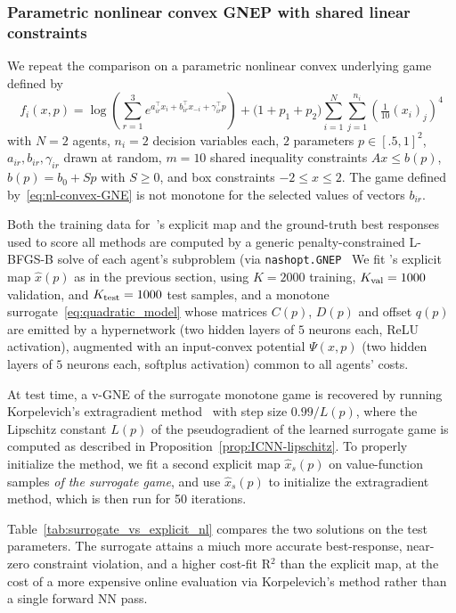 \documentclass[11pt, a4paper]{article}
\theoremstyle{remark}
\theoremstyle{plain}
\begin{document}
\subsubsection{Parametric nonlinear convex GNEP with shared linear constraints}
We repeat the comparison on a parametric nonlinear convex underlying game defined by
\begin{equation}
f_i(x,p)=\log\left(\sum_{r=1}^3e^{a_{ir}^\top x_i+b_{ir}^\top x_{-i}+\gamma_{ir}^\top p}\right)+\bigl(1+p_1+p_2\bigr)\sum_{i=1}^N\sum_{j=1}^{n_i}(\tfrac{1}{10}(x_i)_j)^4
\label{eq:nl-convex-GNE}
\end{equation}
with $N=2$ agents, $n_i=2$ decision variables each, $2$ parameters $p\in[.5,1]^2$, $a_{ir},b_{ir},\gamma_{ir}$ drawn at random, $m=10$ shared inequality constraints $A x\leq b(p)$, $b(p)=b_0+Sp$ with $S\geq 0$, and box constraints $-2\leq x\leq 2$. The game defined by~\eqref{eq:nl-convex-GNE} is not monotone for the selected values of vectors $b_{ir}$.

Both the training data for~\cite{BT26}'s explicit map and the ground-truth best responses used to score all methods are computed by a generic penalty-constrained L-BFGS-B solve of each agent's subproblem (via \texttt{nashopt.GNEP}~\cite{Bem25} 
We fit \cite{BT26}'s explicit map $\hat x(p)$ as in the previous section, using $K=2000$ training, $K_{\rm val}=1000$ validation, and $K_{\rm test}=1000$ test samples, and a monotone surrogate~\eqref{eq:quadratic_model} whose matrices $C(p)$, $D(p)$ and offset $q(p)$ are emitted by a hypernetwork (two hidden layers of $5$ neurons each, ReLU activation), augmented with an input-convex potential $\Psi(x,p)$ (two hidden layers of $5$ neurons each, softplus activation) common to all agents' costs. 

At test time, a v-GNE of the surrogate monotone game is recovered by running 
Korpelevich's extragradient method~\cite{Kor76} with step size $0.99/L(p)$, where the Lipschitz constant $L(p)$ of the pseudogradient of the learned surrogate game is computed as described in Proposition~\ref{prop:ICNN-lipschitz}. To properly initialize the method, we fit a second explicit map $\hat x_s(p)$ on value-function samples {\it of the surrogate game}, and use $\hat x_s(p)$ to initialize the extragradient method, which is then run for 50 iterations. 

Table~\ref{tab:surrogate_vs_explicit_nl} compares the two solutions on the test parameters. The surrogate attains a miuch more accurate best-response, near-zero constraint violation, and a higher cost-fit R$^2$ than the explicit map, at the cost of a more expensive online evaluation via Korpelevich's method rather than a single forward NN pass. 
\end{document}
